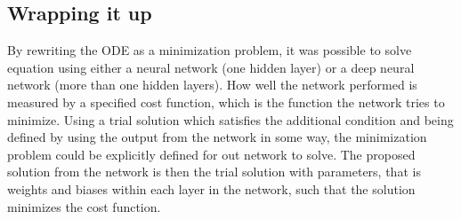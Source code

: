 \documentclass[11pt]{article}
\begin{document}
    \hypertarget{wrapping-it-up}{%
\subsection{Wrapping it up}\label{wrapping-it-up}}

By rewriting the ODE as a minimization problem, it was possible to solve
equation using either a neural network (one hidden layer) or a deep
neural network (more than one hidden layers). How well the network
performed is measured by a specified cost function, which is the
function the network tries to minimize. Using a trial solution which
satisfies the additional condition and being defined by using the output
from the network in some way, the minimization problem could be
explicitly defined for out network to solve. The proposed solution from
the network is then the trial solution with parameters, that is weights
and biases within each layer in the network, such that the solution
minimizes the cost function.


    
    
    
    
\end{document}
